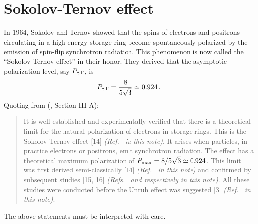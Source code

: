 \documentclass[review]{elsarticle}
\theoremstyle{plain}
\begin{document}
\section{Sokolov-Ternov effect}\label{sec:ST}
In 1964, Sokolov and Ternov \cite{ST} showed that the spins of electrons and positrons circulating in a high-energy storage ring
become spontaneously polarized by the emission of spin-flip synchrotron radiation.
This phenomenon is now called the ``Sokolov-Ternov effect'' in their honor.
They derived that the asymptotic polarization level, say $P_{\rm ST}$, is
\begin{equation}
\label{eq:P_ST}
P_{\rm ST} = \frac{8}{5\sqrt3} \simeq 0.924 \,.
\end{equation}
Quoting from (\cite{RUE}, Section III A):
\begin{quote}
It is well-established and experimentally verified that there
is a theoretical limit for the natural polarization of electrons in
storage rings. This is the Sokolov-Ternov effect [14] \emph{(Ref.~\cite{ST} in this note)}. It arises
when particles, in practice electrons or positrons, emit synchrotron
radiation. The effect has a theoretical maximum polarization
of $P_{\rm max} = 8/5\sqrt3 \simeq 0.924$.
This limit was first derived
semi-classically [14] \emph{(Ref.~\cite{ST} in this note)} and confirmed by subsequent studies
[15, 16] \emph{(Refs.~\cite{DK73} and \cite{JacksonRMP} respectively in this note)}.
All these studies were conducted before the Unruh
effect was suggested [3] \emph{(Ref.~\cite{Unruh} in this note)}.
\end{quote}
The above statements must be interpreted with care.
\end{document}
